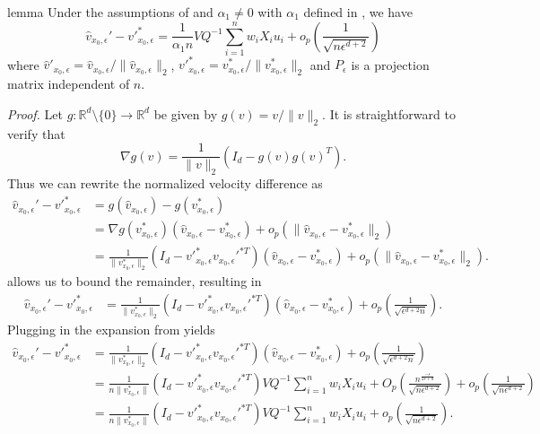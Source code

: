 \documentclass[11pt]{article}
\begin{document}
\begin{restatable}{lemma}{} \label{lemma: norm velocity decomp}
    Under the assumptions of  and $\alpha_1 \neq 0$ with $\alpha_1$ defined in , we have
    \begin{equation}
        \hat{v}_{x_0, \epsilon}' - v'^*_{x_0, \epsilon} = \frac{1}{\alpha_1n}VQ^{-1}\sum_{i = 1}^nw_iX_iu_i  + o_p\left(\frac{1}{\sqrt{n\epsilon^{d+2}}}\right)
    \end{equation}
    where $\hat{v}'_{x_0, \epsilon} = \hat{v}_{x_0, \epsilon}/\|\hat{v}_{x_0, \epsilon}\|_2$, $v'^*_{x_0, \epsilon} = v^*_{x_0, \epsilon}/\|v^*_{x_0, \epsilon}\|_2$ and $P_{\epsilon}$ is a projection matrix independent of $n$.
\end{restatable}
\noindent \textit{Proof.} Let $g: \mathbb{R}^d \setminus \{0\} \rightarrow \mathbb{R}^d$ be given by $g(v) = v/\|v\|_2$. It is straightforward to verify that
\begin{equation}
    \nabla g(v) = \frac{1}{\|v\|_2}(I_d - g(v)g(v)^T).
\end{equation}
Thus we can rewrite the normalized velocity difference as
\begin{align}
    \hat{v}_{x_0, \epsilon}' - v'^*_{x_0, \epsilon} &= g(\hat{v}_{x_0, \epsilon}) - g(v^*_{x_0, \epsilon}) \\
    &= \nabla g(v^*_{x_0, \epsilon})(\hat{v}_{x_0, \epsilon} - v^*_{x_0, \epsilon}) + o_p(\|\hat{v}_{x_0, \epsilon} - v^*_{x_0, \epsilon}\|_2) \\
    &= \frac{1}{\|v^*_{x_0, \epsilon}\|_2}(I_d - v'^*_{x_0, \epsilon}v_{x_0, \epsilon}'^{*T})(\hat{v}_{x_0, \epsilon} - v^*_{x_0, \epsilon}) + o_p(\|\hat{v}_{x_0, \epsilon} - v^*_{x_0, \epsilon}\|_2).
\end{align}
 allows us to bound the remainder, resulting in
\begin{align}
    \hat{v}_{x_0, \epsilon}' - v'^*_{x_0, \epsilon} &= \frac{1}{\|v^*_{x_0, \epsilon}\|_2}(I_d - v'^*_{x_0, \epsilon}v_{x_0, \epsilon}'^{*T})(\hat{v}_{x_0, \epsilon} - v^*_{x_0, \epsilon}) + o_p\left(\frac{1}{\sqrt{\epsilon^{d+2}n}}\right).
\end{align}
Plugging in the expansion from  yields 
\begin{align}
    \hat{v}_{x_0, \epsilon}' - v'^*_{x_0, \epsilon} &= \frac{1}{\|v^*_{x_0, \epsilon}\|_2}(I_d - v'^*_{x_0, \epsilon}v_{x_0, \epsilon}'^{*T})(\hat{v}_{x_0, \epsilon} - v^*_{x_0, \epsilon}) + o_p\left(\frac{1}{\sqrt{\epsilon^{d+2}n}}\right) \\
    &= \frac{1}{n\|v^*_{x_0, \epsilon}\|}(I_d - v'^*_{x_0, \epsilon}v_{x_0, \epsilon}'^{*T})VQ^{-1}\sum_{i = 1}^nw_iX_iu_i +O_p\left(\frac{n^{\frac{-s}{2s+d}}}{\sqrt{n\epsilon^{d+2}}}\right) + o_p\left(\frac{1}{\sqrt{n\epsilon^{d+2}}}\right) \\
    &= \frac{1}{n\|v^*_{x_0, \epsilon}\|}(I_d - v'^*_{x_0, \epsilon}v_{x_0, \epsilon}'^{*T})VQ^{-1}\sum_{i = 1}^nw_iX_iu_i  + o_p\left(\frac{1}{\sqrt{n\epsilon^{d+2}}}\right).
\end{align}
\end{document}
